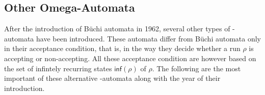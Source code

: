 




\subsection{Other Omega-Automata}
\label{2_om-automata}
After the introduction of Büchi automata in 1962, several other types of \om-automata have been introduced. These automata differ from Büchi automata only in their acceptance condition, that is, in the way they decide whether a run $\rho$ is accepting or non-accepting. All these acceptance condition are however based on the set of infintely recurring states $\textsf{inf}(\rho)$ of $\rho$. The following are the most important of these alternative \om-automata along with the year of their introduction.


